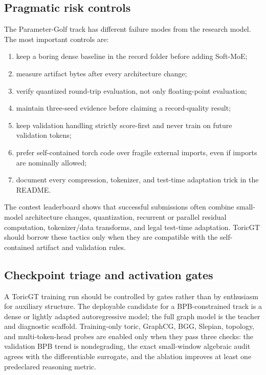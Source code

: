 \documentclass[11pt]{article}
\theoremstyle{definition}
\theoremstyle{plain}
\theoremstyle{remark}
\numberwithin{equation}{section}
\begin{document}
\subsection{Pragmatic risk controls}

The Parameter-Golf track has different failure modes from the research model.  The most important controls are:
\begin{enumerate}[leftmargin=2em]
  \item keep a boring dense baseline in the record folder before adding Soft-MoE;
  \item measure artifact bytes after every architecture change;
  \item verify quantized round-trip evaluation, not only floating-point evaluation;
  \item maintain three-seed evidence before claiming a record-quality result;
  \item keep validation handling strictly score-first and never train on future validation tokens;
  \item prefer self-contained torch code over fragile external imports, even if imports are nominally allowed;
  \item document every compression, tokenizer, and test-time adaptation trick in the README.
\end{enumerate}
The contest leaderboard shows that successful submissions often combine small-model architecture changes, quantization, recurrent or parallel residual computation, tokenizer/data transforms, and legal test-time adaptation.  ToricGT should borrow these tactics only when they are compatible with the self-contained artifact and validation rules.


\subsection{Checkpoint triage and activation gates}\label{subsec:checkpoint-triage}

A ToricGT training run should be controlled by gates rather than by enthusiasm for auxiliary structure.  The deployable candidate for a BPB-constrained track is a dense or lightly adapted autoregressive model; the full graph model is the teacher and diagnostic scaffold.  Training-only toric, GraphCG, BGG, Slepian, topology, and multi-token-head probes are enabled only when they pass three checks: the validation BPB trend is nondegrading, the exact small-window algebraic audit agrees with the differentiable surrogate, and the ablation improves at least one predeclared reasoning metric.
\end{document}
